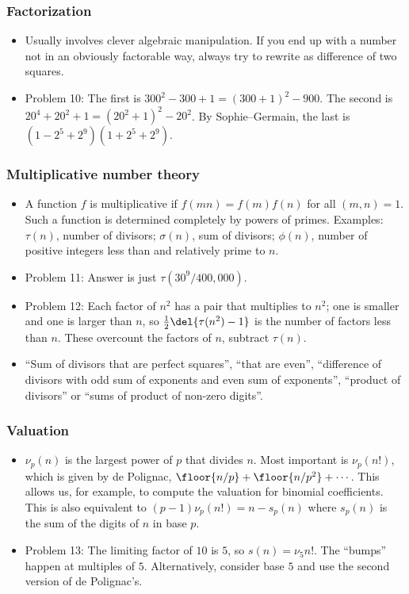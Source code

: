 \documentclass[10pt,paper=letter]{scrartcl}
\begin{document}
\subsubsection*{Factorization}

\begin{itemize}
  \item Usually involves clever algebraic manipulation. If you end up with a number not in an obviously factorable way, always try to rewrite as difference of two squares.
  \item Problem 10: The first is $300^2 - 300 + 1 = (300 + 1)^2 - 900$. The second is $20^4 + 20^2 + 1 = (20^2 + 1)^2 - 20^2$. By Sophie--Germain, the last is $(1 - 2^5 + 2^{9})(1 + 2^5 + 2^{9})$.
\end{itemize}

\subsubsection*{Multiplicative number theory}

\begin{itemize}
  \item A function $f$ is multiplicative if $f(mn) = f(m)f(n)$ for all $(m, n) = 1$. Such a function is determined completely by powers of primes. Examples: $\tau(n)$, number of divisors; $\sigma(n)$, sum of divisors; $\phi(n)$, number of positive integers less than and relatively prime to $n$. 
  \item Problem 11: Answer is just $\tau(30^9/400{,}000)$.
  \item Problem 12: Each factor of $n^2$ has a pair that multiplies to $n^2$; one is smaller and one is larger than $n$, so $\frac12\del{\tau(n^2) - 1}$ is the number of factors less than $n$. These overcount the factors of $n$, subtract $\tau(n)$.
  \item ``Sum of divisors that are perfect squares'', ``that are even'', ``difference of divisors with odd sum of exponents and even sum of exponents'', ``product of divisors'' or ``sums of product of non-zero digits''.
\end{itemize}

\subsubsection*{Valuation}

\begin{itemize}
  \item $\nu_p(n)$ is the largest power of $p$ that divides $n$. Most important is $\nu_p(n!)$, which is given by de Polignac, $\floor{n/p} + \floor{n/p^2} + \cdots$. This allows us, for example, to compute the valuation for binomial coefficients. This is also equivalent to $(p-1)\nu_p(n!) = n - s_p(n)$ where $s_p(n)$ is the sum of the digits of $n$ in base $p$.
  \item Problem 13: The limiting factor of $10$ is $5$, so $s(n) = \nu_{5}{n!}$. The ``bumps'' happen at multiples of $5$. Alternatively, consider base $5$ and use the second version of de Polignac's.
\end{itemize}
\end{document}
